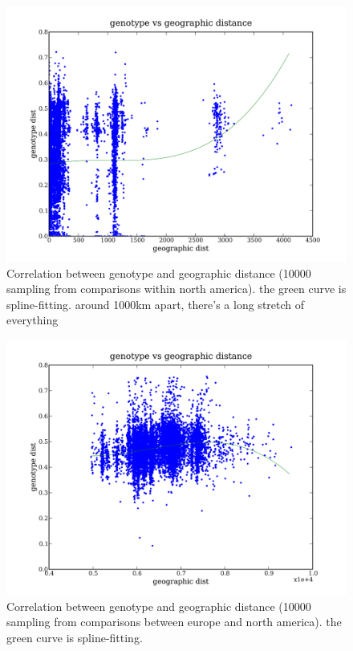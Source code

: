 \documentclass[a4paper,10pt]{article}
\begin{document}
\begin{figure}
\includegraphics[width=1\textwidth]{figures/data_d110_c0_5_geno_vs_geo_dist_noramer.png}
\caption{Correlation between genotype and geographic distance (10000 sampling from comparisons within north america). the green curve is spline-fitting. around 1000km apart, there's a long stretch of everything}\label{fggd_4}
\end{figure}

\begin{figure}
\includegraphics[width=1\textwidth]{figures/data_d110_c0_5_geno_vs_geo_dist_eur_noramer.png}
\caption{Correlation between genotype and geographic distance (10000 sampling from comparisons between europe and north america). the green curve is spline-fitting.}\label{fggd_5}
\end{figure}
\end{document}
